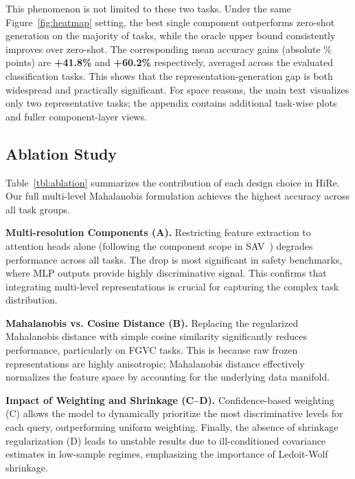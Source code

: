 \documentclass[sigconf,review,anonymous,9pt,table]{acmart}
\newcommand{\minisection}[1]{\smallskip\noindent\textbf{#1}}
\begin{document}
This phenomenon is not limited to these two tasks. Under the same Figure~\ref{fig:heatmap} setting, the best single component outperforms zero-shot generation on the majority of tasks, while the oracle upper bound consistently improves over zero-shot. The corresponding mean accuracy gains (absolute \% points) are \textbf{+41.8\%} and \textbf{+60.2\%} respectively, averaged across the evaluated classification tasks. This shows that the representation-generation gap is both widespread and practically significant. For space reasons, the main text visualizes only two representative tasks; the appendix contains additional task-wise plots and fuller component-layer views.

\subsection{Ablation Study}
\label{sec:ablation}

Table~\ref{tbl:ablation} summarizes the contribution of each design choice in HiRe. Our full multi-level Mahalanobis formulation achieves the highest accuracy across all task groups.

\minisection{Multi-resolution Components (A).}
Restricting feature extraction to attention heads alone (following the component scope in SAV~\cite{mitra2025enhancing}) degrades performance across all tasks. The drop is most significant in safety benchmarks, where MLP outputs provide highly discriminative signal. This confirms that integrating multi-level representations is crucial for capturing the complex task distribution.

\minisection{Mahalanobis vs. Cosine Distance (B).}
Replacing the regularized Mahalanobis distance with simple cosine similarity significantly reduces performance, particularly on FGVC tasks. This is because raw frozen representations are highly anisotropic; Mahalanobis distance effectively normalizes the feature space by accounting for the underlying data manifold.

\minisection{Impact of Weighting and Shrinkage (C--D).}
Confidence-based weighting (C) allows the model to dynamically prioritize the most discriminative levels for each query, outperforming uniform weighting. Finally, the absence of shrinkage regularization (D) leads to unstable results due to ill-conditioned covariance estimates in low-sample regimes, emphasizing the importance of Ledoit-Wolf shrinkage.
\end{document}

